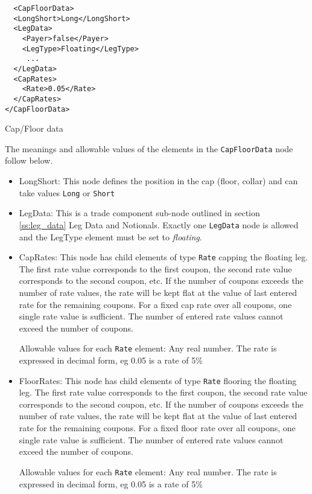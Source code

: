 \begin{listing}[H]
\begin{verbatim}
  <CapFloorData>
  <LongShort>Long</LongShort>
  <LegData>
    <Payer>false</Payer>
    <LegType>Floating</LegType>
     ...
  </LegData>
  <CapRates>
    <Rate>0.05</Rate>
  </CapRates>
</CapFloorData>
\end{verbatim}
\caption{Cap/Floor data}
\label{lst:capfloor_data}
\end{listing}

The meanings and allowable values of the elements in the \lstinline!CapFloorData!  node follow below.

\begin{itemize}

\item LongShort: This node defines the position in the cap (floor, collar) and can take values \lstinline!Long! or
  \lstinline!Short!

\item LegData: This is a trade component sub-node outlined in section \ref{ss:leg_data} Leg Data and Notionals. Exactly
  one \lstinline!LegData! node is allowed and the LegType element must be set to \emph{floating}.

\item CapRates: This node has child elements of type \lstinline!Rate!
  capping the floating leg. The first rate value corresponds to the
  first coupon, the second rate value corresponds to the second
  coupon, etc. If the number of coupons exceeds the number of rate
  values, the rate will be kept flat at the value of last entered rate
  for the remaining coupons. For a fixed cap rate over all coupons,
  one single rate value is sufficient. The number of entered rate
  values cannot exceed the number of coupons. 

  Allowable values for each \lstinline!Rate! element: Any real number. The rate is expressed in decimal form, eg 0.05 is
  a rate of 5\%

\item FloorRates: This node has child elements of type
  \lstinline!Rate! flooring the floating leg.  The first rate value
  corresponds to the first coupon, the second rate value corresponds
  to the second coupon, etc. If the number of coupons exceeds the
  number of rate values, the rate will be kept flat at the value of
  last entered rate for the remaining coupons. For a fixed floor rate
  over all coupons, one single rate value is sufficient. The number of
  entered rate values cannot exceed the number of coupons.

  Allowable values for each \lstinline!Rate! element: Any real number. The rate is expressed in decimal form, eg 0.05 is
  a rate of 5\%

\end{itemize}

